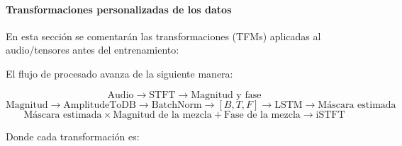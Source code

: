 \paragraph{Transformaciones personalizadas de los datos}

En esta sección se comentarán las transformaciones (TFMs) aplicadas al audio/tensores antes del entrenamiento:

El flujo de procesado avanza de la siguiente manera:

\[
\text{Audio} \rightarrow \text{STFT} \rightarrow \text{Magnitud y fase}
\]
\[
\text{Magnitud} \rightarrow \text{AmplitudeToDB} \rightarrow \text{BatchNorm} \rightarrow [B,T,F] \rightarrow \text{LSTM} \rightarrow \text{Máscara estimada}
\]
\[
\text{Máscara estimada} \times \text{Magnitud de la mezcla} + \text{Fase de la mezcla} \rightarrow \text{iSTFT}
\]

Donde cada transformación es:

